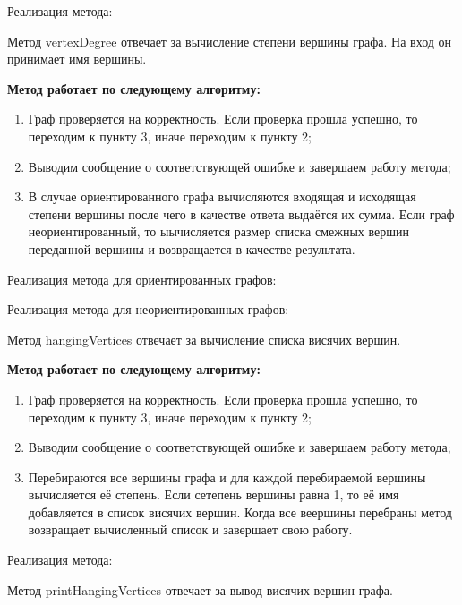 \documentclass[bachelor, och, pract]{SCWorks}
\begin{document}
Реализация метода:
\smallskip


\bigskip

Метод vertexDegree отвечает за вычисление степени вершины графа.
На вход он принимает имя вершины.
\smallskip

\textbf{Метод работает по следующему алгоритму:}

\begin{enumerate}
  \item {Граф проверяется на корректность. Если проверка прошла успешно,
  то переходим к пункту 3, иначе переходим к пункту 2;}
  \item {Выводим сообщение о соответствующей ошибке и завершаем работу метода;}
  \item {В случае ориентированного графа вычисляются входящая и исходящая степени
  вершины после чего в качестве ответа выдаётся их сумма. Если граф неориентированный,
  то ыычисляется размер списка смежных вершин переданной вершины и возвращается
  в качестве результата.}
\end{enumerate}

Реализация метода для ориентированных графов:
\smallskip


\smallskip

Реализация метода для неориентированных графов:
\smallskip


\bigskip

Метод hangingVertices отвечает за вычисление списка висячих
вершин.
\smallskip

\textbf{Метод работает по следующему алгоритму:}
\smallskip

\begin{enumerate}
  \item {Граф проверяется на корректность. Если проверка прошла успешно,
  то переходим к пункту 3, иначе переходим к пункту 2;}
  \item {Выводим сообщение о соответствующей ошибке и завершаем работу метода;}
  \item {Перебираются все вершины графа и для каждой перебираемой вершины вычисляется её
  степень. Если сетепень вершины равна 1, то её имя добавляется в список висячих вершин.
  Когда все веершины перебраны метод возвращает вычисленный список и завершает свою работу.}
\end{enumerate}

Реализация метода:
\smallskip

Метод printHangingVertices отвечает за вывод
висячих вершин графа.
\smallskip
\end{document}
